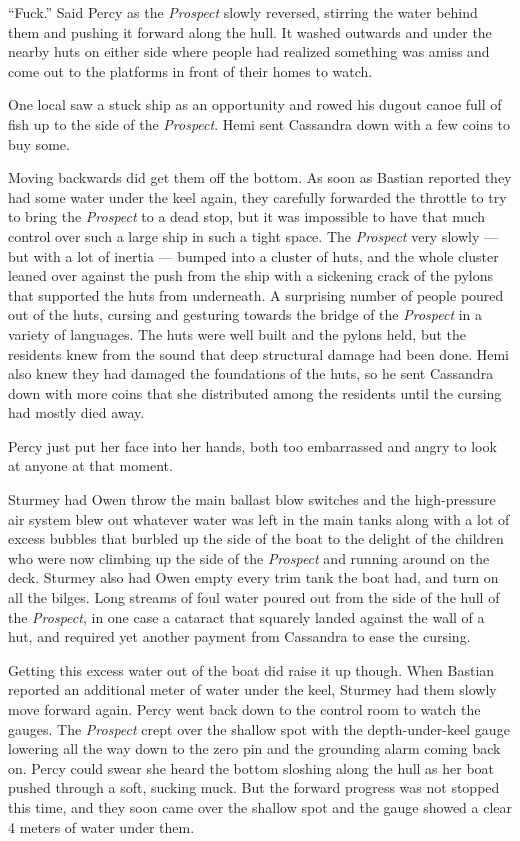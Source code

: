 \documentclass[
]{scrbook}
\begin{document}
``Fuck.'' Said Percy as the \emph{Prospect} slowly reversed, stirring
the water behind them and pushing it forward along the hull. It washed
outwards and under the nearby huts on either side where people had
realized something was amiss and come out to the platforms in front of
their homes to watch.

One local saw a stuck ship as an opportunity and rowed his dugout canoe
full of fish up to the side of the \emph{Prospect}. Hemi sent Cassandra
down with a few coins to buy some.

Moving backwards did get them off the bottom. As soon as Bastian
reported they had some water under the keel again, they carefully
forwarded the throttle to try to bring the \emph{Prospect} to a dead
stop, but it was impossible to have that much control over such a large
ship in such a tight space. The \emph{Prospect} very slowly --- but with
a lot of inertia --- bumped into a cluster of huts, and the whole
cluster leaned over against the push from the ship with a sickening
crack of the pylons that supported the huts from underneath. A
surprising number of people poured out of the huts, cursing and
gesturing towards the bridge of the \emph{Prospect} in a variety of
languages. The huts were well built and the pylons held, but the
residents knew from the sound that deep structural damage had been done.
Hemi also knew they had damaged the foundations of the huts, so he sent
Cassandra down with more coins that she distributed among the residents
until the cursing had mostly died away.

Percy just put her face into her hands, both too embarrassed and angry
to look at anyone at that moment.

Sturmey had Owen throw the main ballast blow switches and the
high-pressure air system blew out whatever water was left in the main
tanks along with a lot of excess bubbles that burbled up the side of the
boat to the delight of the children who were now climbing up the side of
the \emph{Prospect} and running around on the deck. Sturmey also had
Owen empty every trim tank the boat had, and turn on all the bilges.
Long streams of foul water poured out from the side of the hull of the
\emph{Prospect}, in one case a cataract that squarely landed against the
wall of a hut, and required yet another payment from Cassandra to ease
the cursing.

Getting this excess water out of the boat did raise it up though. When
Bastian reported an additional meter of water under the keel, Sturmey
had them slowly move forward again. Percy went back down to the control
room to watch the gauges. The \emph{Prospect} crept over the shallow
spot with the depth-under-keel gauge lowering all the way down to the
zero pin and the grounding alarm coming back on. Percy could swear she
heard the bottom sloshing along the hull as her boat pushed through a
soft, sucking muck. But the forward progress was not stopped this time,
and they soon came over the shallow spot and the gauge showed a clear 4
meters of water under them.
\end{document}
